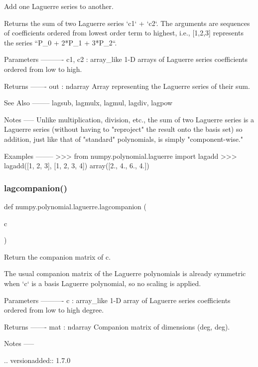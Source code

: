 \begin{DoxyVerb}Add one Laguerre series to another.

Returns the sum of two Laguerre series `c1` + `c2`.  The arguments
are sequences of coefficients ordered from lowest order term to
highest, i.e., [1,2,3] represents the series ``P_0 + 2*P_1 + 3*P_2``.

Parameters
----------
c1, c2 : array_like
    1-D arrays of Laguerre series coefficients ordered from low to
    high.

Returns
-------
out : ndarray
    Array representing the Laguerre series of their sum.

See Also
--------
lagsub, lagmulx, lagmul, lagdiv, lagpow

Notes
-----
Unlike multiplication, division, etc., the sum of two Laguerre series
is a Laguerre series (without having to "reproject" the result onto
the basis set) so addition, just like that of "standard" polynomials,
is simply "component-wise."

Examples
--------
>>> from numpy.polynomial.laguerre import lagadd
>>> lagadd([1, 2, 3], [1, 2, 3, 4])
array([2.,  4.,  6.,  4.])\end{DoxyVerb}
 \mbox{\label{namespacenumpy_1_1polynomial_1_1laguerre_a7e55177ec454279a32b19dc51574bb40}} 
\subsubsection{\texorpdfstring{lagcompanion()}{lagcompanion()}}
{\footnotesize\ttfamily def numpy.\+polynomial.\+laguerre.\+lagcompanion (\begin{DoxyParamCaption}\item[{}]{c }\end{DoxyParamCaption})}

\begin{DoxyVerb}Return the companion matrix of c.

The usual companion matrix of the Laguerre polynomials is already
symmetric when `c` is a basis Laguerre polynomial, so no scaling is
applied.

Parameters
----------
c : array_like
    1-D array of Laguerre series coefficients ordered from low to high
    degree.

Returns
-------
mat : ndarray
    Companion matrix of dimensions (deg, deg).

Notes
-----

.. versionadded:: 1.7.0\end{DoxyVerb}
 \mbox{\label{namespacenumpy_1_1polynomial_1_1laguerre_ac6411a31d45519fa3f544b39781665ee}} 
